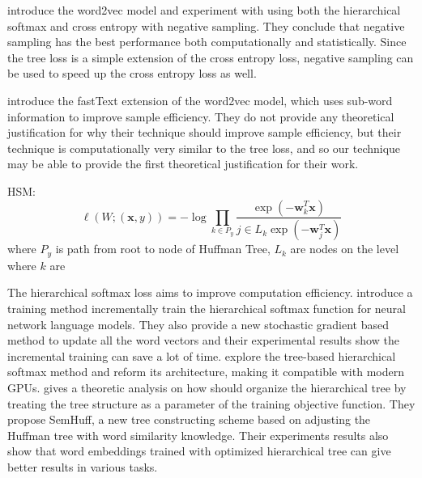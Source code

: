 \documentclass[twoside]{article}
\theoremstyle{definition}
\newcommand{\trans}[1]{{#1}^{T}}
\newcommand{\w}{\mathbf w}
\newcommand{\x}{\mathbf x}
\newcommand{\fixme}[1]{\noindent{\color{red}\textbf{FIXME:}  {#1}}}
\begin{document}
\cite{mikolov2013distributed} introduce the word2vec model and experiment with using both the hierarchical softmax and cross entropy with negative sampling.
They conclude that negative sampling has the best performance both computationally and statistically.
Since the tree loss is a simple extension of the cross entropy loss,
negative sampling can be used to speed up the cross entropy loss as well.

\cite{bojanowski2017enriching} introduce the fastText extension of the word2vec model, which uses sub-word information to improve sample efficiency.
They do not provide any theoretical justification for why their technique should improve sample efficiency,
but their technique is computationally very similar to the tree loss,
and so our technique may be able to provide the first theoretical justification for their work.

HSM:
\begin{equation}
    \label{eq:xentropy}
    \ell(W;(\x,y)) = - \log \prod_{k\in P_y}\frac {\exp(-\trans\w_k \x)}{j\in L_k \exp(-\trans \w_j \x)}
\end{equation}
where $P_y$ is path from root to node of Huffman Tree,
$L_k$ are nodes on the level where $k$ are




The hierarchical softmax loss aims to improve computation efficiency. 
\cite{Peng2017IncrementallyLT} introduce a training method incrementally train the hierarchical softmax function for neural network language models.
They also provide a new stochastic gradient based method to update all the word vectors and their experimental results show the incremental training can save a lot of time.
\cite{Jiang2017ExplorationOT} explore the tree-based hierarchical softmax method and reform its architecture, making it compatible with modern GPUs.
\cite{Yang2017OptimizeHS} gives a theoretic analysis on how should organize the hierarchical tree by treating the tree structure as a parameter of the training objective function.
They propose SemHuff, a new tree constructing scheme based on adjusting the Huffman tree with word similarity knowledge.
Their experiments results also show that word embeddings trained with optimized hierarchical tree can give better results in various tasks.
\end{document}
